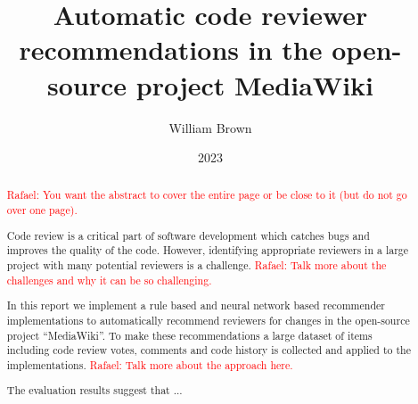 \documentclass[bsc]{abdnthesis}
\title{Automatic code reviewer recommendations in the open-source project MediaWiki}
\author{William Brown}
\date{2023}
\newcommand{\rcnote}[1]{\noindent \textcolor{red}{Rafael: {#1}}}
\begin{document}

\maketitle
\makedeclaration


\begin{abstract}
\rcnote{You want the abstract to cover the entire page or be close to it (but do not go over one page).}

  Code review is a critical part of software development which catches bugs and improves the quality of the code. However, identifying appropriate reviewers in a large project with many potential reviewers is a challenge. \rcnote{Talk more about the challenges and why it can be so challenging.}
  
  In this report we implement a rule based and neural network based recommender implementations to automatically recommend reviewers for changes in the open-source project ``MediaWiki''. To make these recommendations a large dataset of items including code review votes, comments and code history is collected and applied to the implementations. \rcnote{Talk more about the approach here.}
  
  The evaluation results suggest that ... %
\end{abstract}

\begin{acknowledgements}
\begingroup
\let\clearpage\relax
  
  \endgroup
\end{acknowledgements}


\tableofcontents
\listoftables
\listoffigures










\appendix
{}
% 



\end{document}
